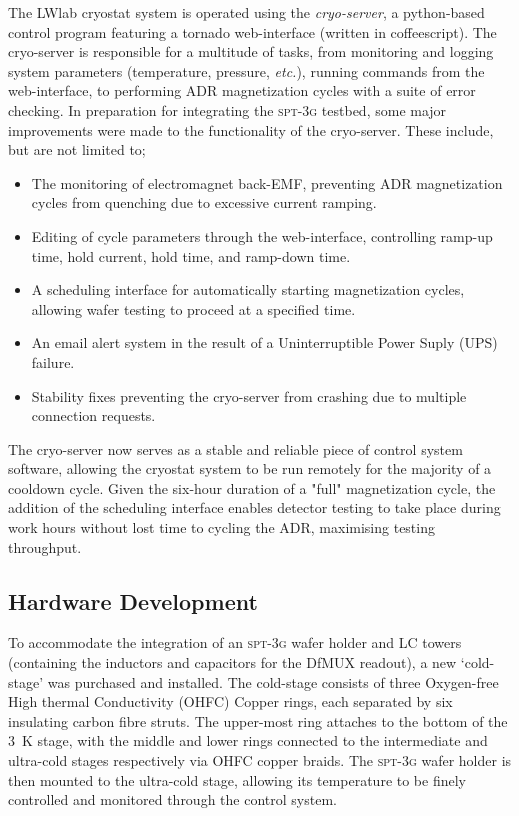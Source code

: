 \documentclass[iop]{emulateapj}
\begin{document}
The LWlab cryostat system is operated using the \textit{cryo-server}, a python-based control program featuring a tornado web-interface (written in coffeescript).  The cryo-server is responsible for a multitude of tasks, from monitoring and logging system parameters (temperature, pressure, \textit{etc.}), running commands from the web-interface, to performing ADR magnetization cycles with a suite of error checking.  In preparation for integrating the \textsc{spt-3g} testbed, some major improvements were made to the functionality of the cryo-server.  These include, but are not limited to;
\begin{itemize}[noitemsep,nolistsep]
	\item The monitoring of electromagnet back-EMF, preventing ADR magnetization cycles from quenching due to excessive current ramping.
	\item Editing of cycle parameters through the web-interface, controlling ramp-up time, hold current, hold time, and ramp-down time.
	\item A scheduling interface for automatically starting magnetization cycles, allowing wafer testing to proceed at a specified time.
	\item An email alert system in the result of a Uninterruptible Power Suply (UPS) failure.
	\item Stability fixes preventing the cryo-server from crashing due to multiple connection requests.
\end{itemize}
The cryo-server now serves as a stable and reliable piece of control system software, allowing the cryostat system to be run remotely for the majority of a cooldown cycle.  Given the six-hour duration of a "full" magnetization cycle, the addition of the scheduling interface enables detector testing to take place during work hours without lost time to cycling the ADR, maximising testing throughput.

\subsection{Hardware Development}

To accommodate the integration of an \textsc{spt-3g} wafer holder and LC towers (containing the inductors and capacitors for the DfMUX readout), a new `cold-stage' was purchased and installed.  The cold-stage consists of three Oxygen-free High thermal Conductivity (OHFC) Copper rings, each separated by six insulating carbon fibre struts.  The upper-most ring attaches to the bottom of the 3~K stage, with the middle and lower rings connected to the intermediate and ultra-cold stages respectively via OHFC copper braids.  The \textsc{spt-3g} wafer holder is then mounted to the ultra-cold stage, allowing its temperature to be finely controlled and monitored through the control system.
\end{document}
